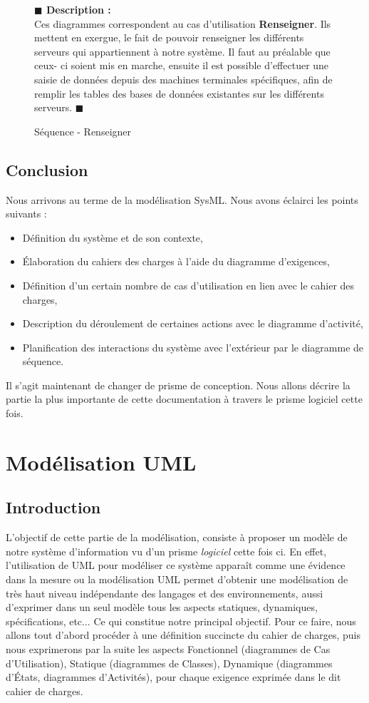 \documentclass[11pt, titlepage]{report}
\newcommand{\debutDescription}{\noindent\textbf{\textcolor{DescriptionColor}{$\blacksquare$  Description : \\}}}
\newcommand{\finDescription}{\noindent\textcolor{DescriptionColor}{$\blacksquare$}}
\begin{document}
\begin{figure}[h!]
\begin{center}
\caption{Séquence - Renseigner}
\end{center}
\debutDescription
Ces diagrammes correspondent au cas d'utilisation \textbf{Renseigner}. Ils mettent en exergue, le fait de pouvoir renseigner les différents serveurs qui appartiennent à notre système. Il faut au préalable que ceux- ci soient mis en marche, ensuite il est possible d'effectuer une saisie de données depuis des machines terminales spécifiques, afin de remplir les tables des bases de données existantes sur les différents serveurs.
\finDescription
\end{figure}
\newpage
\section{Conclusion}
Nous arrivons au terme de la modélisation SysML. Nous avons éclairci les points suivants  :
\begin{itemize}
\item Définition du système et de son contexte,
\item Élaboration du cahiers des charges à l'aide du diagramme d'exigences,
\item Définition d'un certain nombre de cas d'utilisation en lien avec le cahier des charges,
\item Description du déroulement de certaines actions avec le diagramme d'activité,
\item Planification des interactions du système avec l’extérieur par le diagramme de séquence.
\end{itemize} 
Il s'agit maintenant de changer de prisme de conception. Nous allons décrire la partie la plus importante de cette documentation à travers le prisme logiciel cette fois.
\clearpage



\chapter{Modélisation UML}
\label{chap:UML}
\section{Introduction}
L'objectif de cette partie de la modélisation, consiste à proposer un modèle de notre système d'information vu d'un prisme \textit{logiciel} cette fois ci. En effet, l'utilisation de UML pour modéliser ce système apparaît comme une évidence dans la mesure ou la modélisation UML permet d'obtenir une modélisation de très haut niveau indépendante des langages et des environnements, aussi 
d'exprimer dans un seul modèle tous les aspects statiques, dynamiques, spécifications, etc... Ce qui constitue notre principal objectif. Pour ce faire, nous allons tout d'abord procéder à une définition succincte du cahier de charges, puis nous exprimerons par la suite les aspects Fonctionnel (diagrammes de Cas d'Utilisation), Statique (diagrammes de Classes), Dynamique (diagrammes d’États, diagrammes d'Activités), pour chaque exigence exprimée dans le dit cahier de charges.
\end{document}

